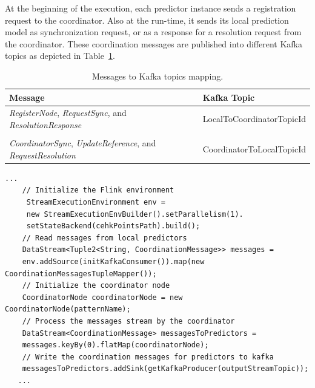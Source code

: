  \par At the beginning of the execution,  each predictor instance sends a registration request to the coordinator. Also at the run-time,  it sends  its local prediction model as synchronization request,  or as a response for a resolution request from the coordinator. These coordination messages are published into different Kafka topics as depicted in Table~\ref{tab:messagesToTopics}. 
\begin{center}
\centering
\begin{table}[h]
	\caption{Messages to Kafka topics mapping.}
	\label{tab:messagesToTopics}
	\begin{tabular}{p{8cm}l}
		\toprule
		Message &Kafka Topic\\
		\midrule
		\parbox[t]{8cm}{\textit{RegisterNode}, \textit{RequestSync},  and \textit{ResolutionResponse} } & LocalToCoordinatorTopicId\\ \\
		
			  \parbox[t]{8cm}{\textit{CoordinatorSync}, \textit{UpdateReference}, and \\ \textit{RequestResolution}} & CoordinatorToLocalTopicId\\
		\bottomrule
	\end{tabular}
\end{table}

\end{center}

\begin{center}
	\centering
\begin{lstlisting}[caption={The coordinator Flink program.},label={algonline:flink2},frame=single]
    ...
	// Initialize the Flink environment	 
	 StreamExecutionEnvironment env =
	 new StreamExecutionEnvBuilder().setParallelism(1).
	 setStateBackend(cehkPointsPath).build();	 
	// Read messages from local predictors
	DataStream<Tuple2<String, CoordinationMessage>> messages =
	env.addSource(initKafkaConsumer()).map(new CoordinationMessagesTupleMapper());	
	// Initialize the coordinator node
	CoordinatorNode coordinatorNode = new CoordinatorNode(patternName);	
	// Process the messages stream by the coordinator
	DataStream<CoordinationMessage> messagesToPredictors =
	messages.keyBy(0).flatMap(coordinatorNode);	
	// Write the coordination messages for predictors to kafka
	messagesToPredictors.addSink(getKafkaProducer(outputStreamTopic));
   ...
\end{lstlisting}
\end{center}

